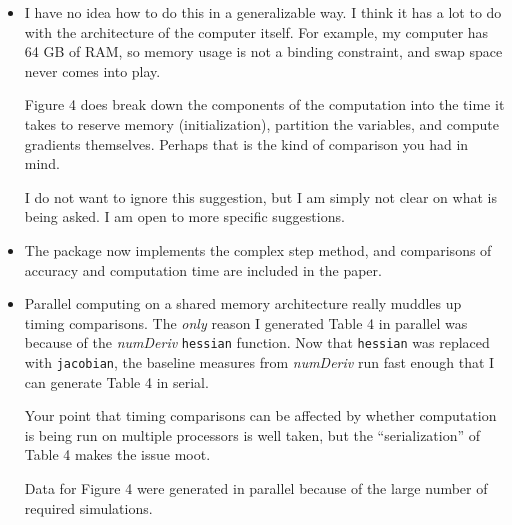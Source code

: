 \documentclass{article}
\newcommand{\pkg}[1]{\emph{#1}}
\newcommand{\code}[1]{\texttt{#1}}
\newcommand{\func}[1]{\code{#1}}
\newenvironment{response}{\normalfont}{\vspace{\baselineskip}}
\begin{document}
\begin{enumerate}[align=left]
\begin{response}
\begin{itemize}
\item I have no idea how to do this in a generalizable way.  I think
  it has a lot to do with the architecture of the computer
  itself.  For example, my computer has 64 GB of RAM, so memory usage
  is not a binding constraint, and swap space never comes into play.

  Figure 4 does break down the components of the computation
  into the time it takes to reserve memory (initialization), partition
  the variables, and compute gradients themselves.  Perhaps that is
  the kind of comparison you had in mind.

  I do not want to ignore this suggestion, but I am simply not clear on
  what is being asked.  I am open to more specific suggestions.

\item The package now implements the complex step method, and comparisons of
  accuracy and computation time are included in the paper.

\item Parallel computing on a shared memory architecture really
  muddles up timing comparisons.  The \emph{only} reason I generated
  Table 4 in parallel was because of the \pkg{numDeriv} \func{hessian}
  function. Now that \func{hessian} was replaced with \func{jacobian},
  the baseline measures from \pkg{numDeriv} run fast enough that I can
  generate Table 4 in serial.

Your point that timing comparisons can be affected by
whether computation is being run on multiple processors is well taken, but the
``serialization'' of Table 4 makes the issue moot.

  Data for Figure 4 were generated in parallel because of the large
  number of required simulations.



    \end{itemize}

    
  \end{response}



  


\end{enumerate}
\end{document}
